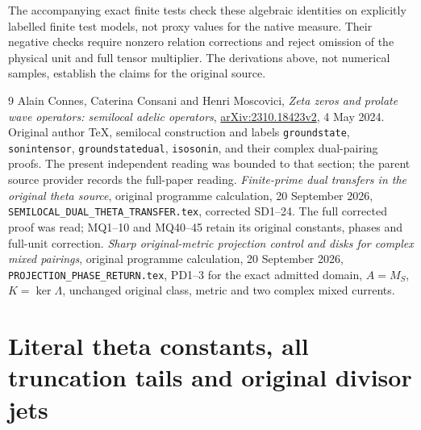 The accompanying exact finite tests check these algebraic identities
on explicitly labelled finite test models, not proxy values for the
native measure. Their negative checks require nonzero relation
corrections and reject omission of the physical unit and full
tensor multiplier. The derivations above, not numerical samples,
establish the claims for the original source.

\begin{thebibliography}{9}
 Alain Connes, Caterina Consani and Henri Moscovici,
\emph{Zeta zeros and prolate wave operators: semilocal adelic operators},
\href{https://arxiv.org/abs/2310.18423v2}{arXiv:2310.18423v2},
4 May 2024. Original author TeX, semilocal construction and labels
\texttt{groundstate}, \texttt{sonintensor}, \texttt{groundstatedual},
\texttt{isosonin}, and their complex dual-pairing proofs. The present
independent reading was bounded to that section; the parent source
provider records the full-paper reading.
 \emph{Finite-prime dual transfers in the original theta
source}, original programme calculation, 20 September 2026,
\texttt{SEMILOCAL\_DUAL\_THETA\_TRANSFER.tex}, corrected SD1--24.
The full corrected proof was read; MQ1--10 and MQ40--45 retain its
original constants, phases and full-unit correction.
 \emph{Sharp original-metric projection control and disks
for complex mixed pairings}, original programme calculation,
20 September 2026, \texttt{PROJECTION\_PHASE\_RETURN.tex},
PD1--3 for the exact admitted domain, $A=M_S$, $K=\ker\Lambda$,
unchanged original class, metric and two complex mixed currents.
\end{thebibliography}

\endgroup

\clearpage\begingroup
\part*{Literal theta constants, all truncation tails and original divisor jets}
\newtheorem{swthetatheorem}{Theorem}[section]
\newtheorem{swthetaproposition}[swthetatheorem]{Proposition}
\newcommand{\swthetaR}{\mathbb R}\newcommand{\swthetaC}{\mathbb C}
\newcommand{\swthetaM}{\mathcal M}\newcommand{\swthetaE}{\mathcal E}


